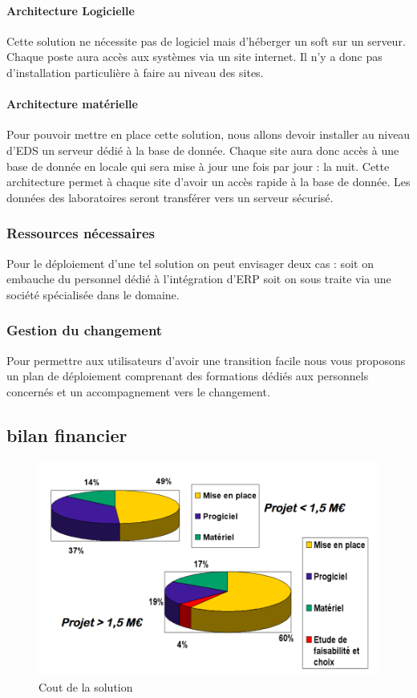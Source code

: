 \paragraph{Architecture Logicielle}
Cette solution ne nécessite pas de logiciel mais d'héberger un soft sur un serveur. Chaque poste aura accès aux systèmes via un site internet. Il n'y a donc pas d'installation particulière à faire au niveau des sites.
\paragraph{Architecture matérielle}
Pour pouvoir mettre en place cette solution, nous allons devoir installer au niveau d'EDS un serveur dédié à la base de donnée. Chaque site aura donc accès à une base de donnée en locale qui sera mise à jour une fois par jour : la nuit. Cette architecture permet à chaque site d'avoir un accès rapide à la base de donnée. Les données des laboratoires seront transférer vers un serveur sécurisé. 
\subsubsection{Ressources nécessaires}
Pour le déploiement d'une tel solution on peut envisager deux cas : soit on embauche du personnel dédié à l'intégration d'ERP soit on sous traite via une société spécialisée dans le domaine.
\subsubsection{Gestion du changement}
Pour permettre aux utilisateurs d'avoir une transition facile nous vous proposons un plan de déploiement comprenant des formations dédiés aux personnels concernés et un accompagnement vers le changement.
\subsection{bilan financier}
\begin{figure}[H]
\begin{center}
 \includegraphics[scale=0.5]{CoutSolution.png}
  \caption{Cout de la solution}
\end{center}  
\end{figure}

